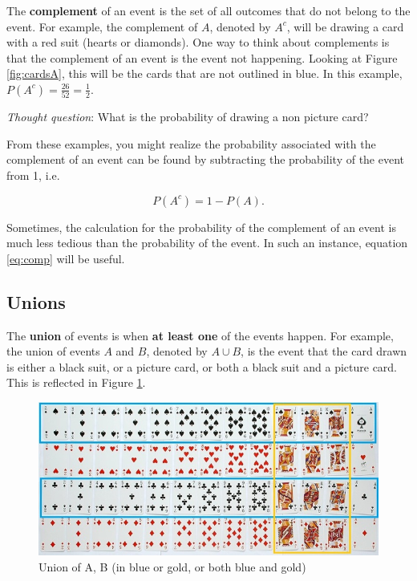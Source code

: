 \documentclass[
]{book}
\begin{document}
The \textbf{complement} of an event is the set of all outcomes that do not belong to the event. For example, the complement of \(A\), denoted by \(A^c\), will be drawing a card with a red suit (hearts or diamonds). One way to think about complements is that the complement of an event is the event not happening. Looking at Figure \ref{fig:cardsA}, this will be the cards that are not outlined in blue. In this example, \(P(A^c) = \frac{26}{52} = \frac{1}{2}\).

\emph{Thought question}: What is the probability of drawing a non picture card?

From these examples, you might realize the probability associated with the complement of an event can be found by subtracting the probability of the event from 1, i.e.

\begin{equation} 
P(A^c) = 1 - P(A).
\label{eq:comp}
\end{equation}

Sometimes, the calculation for the probability of the complement of an event is much less tedious than the probability of the event. In such an instance, equation \eqref{eq:comp} will be useful.

\hypertarget{unions}{%
\subsection{Unions}\label{unions}}

The \textbf{union} of events is when \textbf{at least one} of the events happen. For example, the union of events \(A\) and \(B\), denoted by \(A \cup B\), is the event that the card drawn is either a black suit, or a picture card, or both a black suit and a picture card. This is reflected in Figure \ref{fig:cardsAB}.

\begin{figure}
\centering
\includegraphics{images/02-cardsAB.jpg}
\caption{\label{fig:cardsAB}Union of A, B (in blue or gold, or both blue and gold)}
\end{figure}
\end{document}
